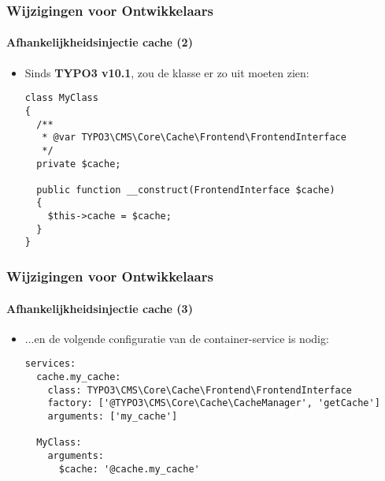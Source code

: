 
\begin{frame}[fragile]
	\frametitle{Wijzigingen voor Ontwikkelaars}
	\framesubtitle{Afhankelijkheidsinjectie cache (2)}

	\lstset{basicstyle=\tiny\ttfamily}

	\begin{itemize}
		\item Sinds \textbf{TYPO3 v10.1}, zou de klasse er zo uit moeten zien:

\begin{lstlisting}
class MyClass
{
  /**
   * @var TYPO3\CMS\Core\Cache\Frontend\FrontendInterface
   */
  private $cache;

  public function __construct(FrontendInterface $cache)
  {
    $this->cache = $cache;
  }
}
\end{lstlisting}

	\end{itemize}

\end{frame}


\begin{frame}[fragile]
	\frametitle{Wijzigingen voor Ontwikkelaars}
	\framesubtitle{Afhankelijkheidsinjectie cache (3)}

	\lstset{basicstyle=\tiny\ttfamily}

	\begin{itemize}
		\item ...en de volgende configuratie van de container-service is nodig:

\begin{lstlisting}
services:
  cache.my_cache:
    class: TYPO3\CMS\Core\Cache\Frontend\FrontendInterface
    factory: ['@TYPO3\CMS\Core\Cache\CacheManager', 'getCache']
    arguments: ['my_cache']

  MyClass:
    arguments:
      $cache: '@cache.my_cache'
\end{lstlisting}

	\end{itemize}

\end{frame}

